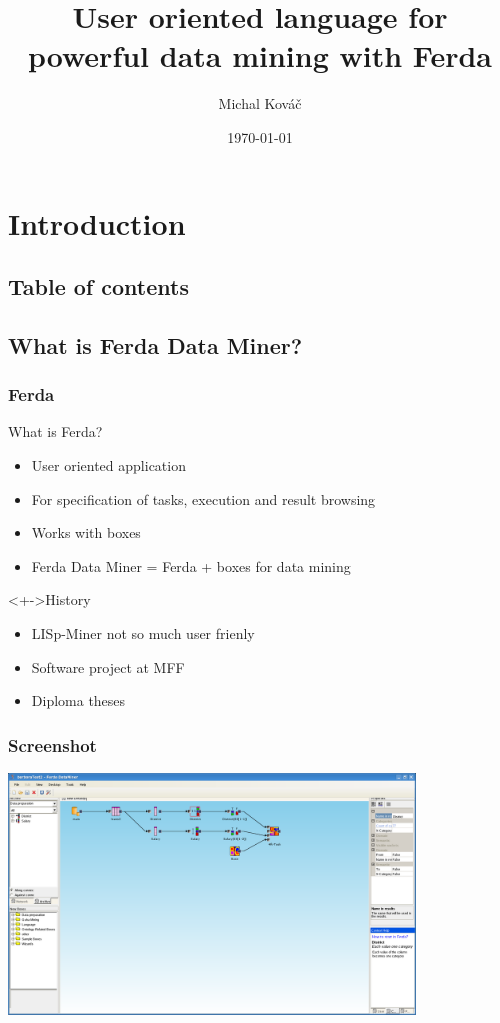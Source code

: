 \documentclass{beamer}
\author{Michal Kov\'{a}\v{c}}
\title{User oriented language for powerful data mining with Ferda}
\date{\today}
\begin{document}
\frame{\titlepage}

\section{Introduction}
\subsection{Table of contents}


\subsection{What is Ferda Data Miner?}
\begin{frame}
	\frametitle{Ferda}
	\begin{block}{What is Ferda?}
		\begin{itemize}[<+->]
			\item User oriented application
			\item For specification of tasks, execution and result browsing
			\item Works with boxes
			\item Ferda Data Miner = Ferda + boxes for data mining
		\end{itemize}
	\end{block}
	\begin{block}<+->{History}
		\begin{itemize}[<+->]
			\item LISp-Miner not so much user frienly
			\item Software project at MFF
			\item Diploma theses
		\end{itemize}
	\end{block}
\end{frame}

\begin{frame}
	\frametitle{Screenshot}
	\includegraphics[width=10.8cm]{ferda}
\end{frame}
\end{document}

